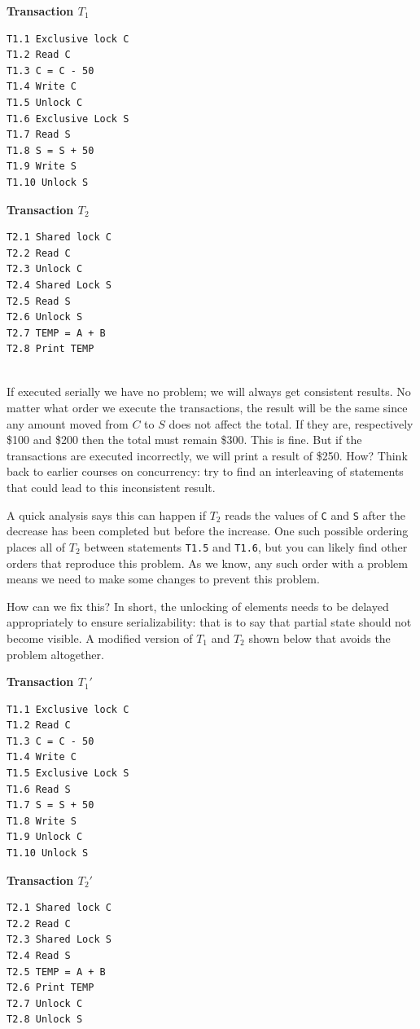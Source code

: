 \begin{multicols}{2}
\textbf{Transaction $T_{1}$}
\begin{verbatim}
T1.1 Exclusive lock C
T1.2 Read C
T1.3 C = C - 50
T1.4 Write C
T1.5 Unlock C
T1.6 Exclusive Lock S
T1.7 Read S
T1.8 S = S + 50
T1.9 Write S
T1.10 Unlock S
\end{verbatim}

\columnbreak
\textbf{Transaction $T_{2}$}
\begin{verbatim}
T2.1 Shared lock C
T2.2 Read C
T2.3 Unlock C
T2.4 Shared Lock S
T2.5 Read S
T2.6 Unlock S
T2.7 TEMP = A + B
T2.8 Print TEMP


\end{verbatim}
\end{multicols}

If executed serially we have no problem; we will always get consistent results. No matter what order we execute the transactions, the result will be the same since any amount moved from $C$ to $S$ does not affect the total. If they are, respectively \$100 and \$200 then the total must remain \$300. This is fine. But if the transactions are executed incorrectly, we will print a result of \$250. How?  Think back to earlier courses on concurrency: try to find an interleaving of statements that could lead to this inconsistent result.

A quick analysis says this can happen if $T_{2}$ reads the values of \texttt{C} and \texttt{S} after the decrease has been completed but before the increase. One such possible ordering places all of $T_{2}$ between statements \texttt{T1.5} and \texttt{T1.6}, but you can likely find other orders that reproduce this problem. As we know, any such order with a problem means we need to make some changes to prevent this problem.

How can we fix this? In short, the unlocking of elements needs to be delayed appropriately to ensure serializability: that is to say that partial state should not become visible. A modified version of $T_{1}$ and $T_{2}$ shown below that avoids the problem altogether.

\begin{multicols}{2}
\textbf{Transaction $T_{1}'$}
\begin{verbatim}
T1.1 Exclusive lock C
T1.2 Read C
T1.3 C = C - 50
T1.4 Write C
T1.5 Exclusive Lock S
T1.6 Read S
T1.7 S = S + 50
T1.8 Write S
T1.9 Unlock C
T1.10 Unlock S
\end{verbatim}

\columnbreak
\textbf{Transaction $T_{2}'$}
\begin{verbatim}
T2.1 Shared lock C
T2.2 Read C
T2.3 Shared Lock S
T2.4 Read S
T2.5 TEMP = A + B
T2.6 Print TEMP
T2.7 Unlock C
T2.8 Unlock S


\end{verbatim}
\end{multicols}

